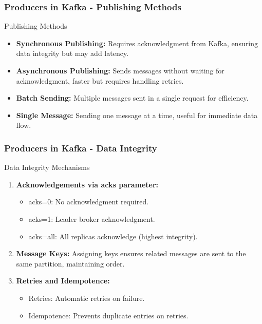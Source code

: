 \documentclass[aspectratio=169]{beamer}
\begin{document}
\begin{frame}[fragile]
    \frametitle{Producers in Kafka - Publishing Methods}
    \begin{block}{Publishing Methods}
        \begin{itemize}
            \item \textbf{Synchronous Publishing:} Requires acknowledgment from Kafka, ensuring data integrity but may add latency.
            \item \textbf{Asynchronous Publishing:} Sends messages without waiting for acknowledgment, faster but requires handling retries.
            \item \textbf{Batch Sending:} Multiple messages sent in a single request for efficiency.
            \item \textbf{Single Message:} Sending one message at a time, useful for immediate data flow.
        \end{itemize}
    \end{block}
\end{frame}

\begin{frame}[fragile]
    \frametitle{Producers in Kafka - Data Integrity}
    \begin{block}{Data Integrity Mechanisms}
        \begin{enumerate}
            \item \textbf{Acknowledgements via acks parameter:}
                \begin{itemize}
                    \item acks=0: No acknowledgment required.
                    \item acks=1: Leader broker acknowledgment.
                    \item acks=all: All replicas acknowledge (highest integrity).
                \end{itemize}
            \item \textbf{Message Keys:} Assigning keys ensures related messages are sent to the same partition, maintaining order.
            \item \textbf{Retries and Idempotence:}
                \begin{itemize}
                    \item Retries: Automatic retries on failure.
                    \item Idempotence: Prevents duplicate entries on retries.
                \end{itemize}
        \end{enumerate}
    \end{block}
\end{frame}
\end{document}
